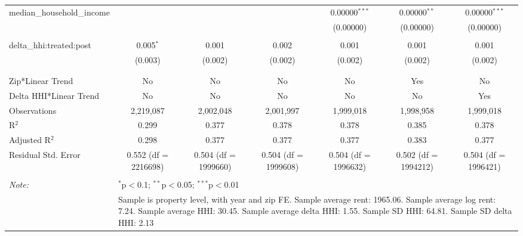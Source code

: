 \begin{table}[H]
{\begin{tabular}{@{\extracolsep{5pt}}lcccccc}
  median\_household\_income &  &  &  & 0.00000$^{***}$ & 0.00000$^{**}$ & 0.00000$^{***}$ \\  

   &  &  &  & (0.00000) & (0.00000) & (0.00000) \\  

   & & & & & & \\  

  delta\_hhi:treated:post & 0.005$^{*}$ & 0.001 & 0.002 & 0.001 & 0.001 & 0.001 \\  

   & (0.003) & (0.002) & (0.002) & (0.002) & (0.002) & (0.002) \\  

   & & & & & & \\  

 \hline \\[-1.8ex]  

 Zip*Linear Trend & No & No & No & No & Yes & No \\  

 Delta HHI*Linear Trend & No & No & No & No & No & Yes \\  

 Observations & 2,219,087 & 2,002,048 & 2,001,997 & 1,999,018 & 1,998,958 & 1,999,018 \\  

 R$^{2}$ & 0.299 & 0.377 & 0.378 & 0.378 & 0.385 & 0.378 \\  

 Adjusted R$^{2}$ & 0.298 & 0.377 & 0.377 & 0.377 & 0.383 & 0.377 \\  

 Residual Std. Error & 0.552 (df = 2216698) & 0.504 (df = 1999660) & 0.504 (df = 1999608) & 0.504 (df = 1996632) & 0.502 (df = 1994212) & 0.504 (df = 1996421) \\  

 \hline  

 \hline \\[-1.8ex]  

 \textit{Note:}  & \multicolumn{6}{l}{$^{*}$p$<$0.1; $^{**}$p$<$0.05; $^{***}$p$<$0.01} \\  

  & \multicolumn{6}{l}{Sample is property level, with year and zip FE. Sample average rent: 1965.06. Sample average log rent: 7.24. Sample average HHI: 30.45. Sample average delta HHI: 1.55. Sample SD HHI: 64.81. Sample SD delta HHI: 2.13} \\  

 \end{tabular}}  

 \end{table}  

